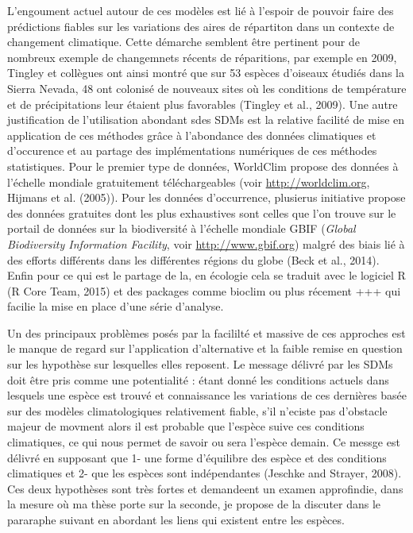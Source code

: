 L'engoument actuel autour de ces modèles est lié à l'espoir de pouvoir
faire des prédictions fiables sur les variations des aires de répartiton
dans un contexte de changement climatique. Cette démarche semblent être
pertinent pour de nombreux exemple de changemnets récents de
réparitions, par exemple en 2009, Tingley et collègues ont ainsi montré
que sur 53 espèces d'oiseaux étudiés dans la Sierra Nevada, 48 ont
colonisé de nouveaux sites où les conditions de température et de
précipitations leur étaient plus favorables (Tingley et al., 2009). Une
autre justification de l'utilisation abondant sdes SDMs est la relative
facilité de mise en application de ces méthodes grâce à l'abondance des
données climatiques et d'occurence et au partage des implémentations
numériques de ces méthodes statistiques. Pour le premier type de
données, WorldClim propose des données à l'échelle mondiale gratuitement
téléchargeables (voir \url{http://worldclim.org}, Hijmans et al.
(2005)). Pour les données d'occurrence, plusierus initiative propose des
données gratuites dont les plus exhaustives sont celles que l'on trouve
sur le portail de données sur la biodiversité à l'échelle mondiale GBIF
(\emph{Global Biodiversity Information Facility}, voir
\url{http://www.gbif.org}) malgré des biais lié à des efforts différents
dans les différentes régions du globe (Beck et al., 2014). Enfin pour ce
qui est le partage de la, en écologie cela se traduit avec le logiciel R
(R Core Team, 2015) et des packages comme bioclim ou plus récement +++
qui facilie la mise en place d'une série d'analyse.

Un des principaux problèmes posés par la facililté et massive de ces
approches est le manque de regard sur l'application d'alternative et la
faible remise en question sur les hypothèse sur lesquelles elles
reposent. Le message délivré par les SDMs doit être pris comme une
potentialité : étant donné les conditions actuels dans lesquels une
espèce est trouvé et connaissance les variations de ces dernières basée
sur des modèles climatologiques relativement fiable, s'il n'eciste pas
d'obstacle majeur de movment alors il est probable que l'espèce suive
ces conditions climatiques, ce qui nous permet de savoir ou sera
l'espèce demain. Ce messge est délivré en supposant que 1- une forme
d'équilibre des espèce et des conditions climatiques et 2- que les
espèces sont indépendantes (Jeschke and Strayer, 2008). Ces deux
hypothèses sont très fortes et demandeent un examen approfindie, dans la
mesure où ma thèse porte sur la seconde, je propose de la discuter dans
le pararaphe suivant en abordant les liens qui existent entre les
espèces.

